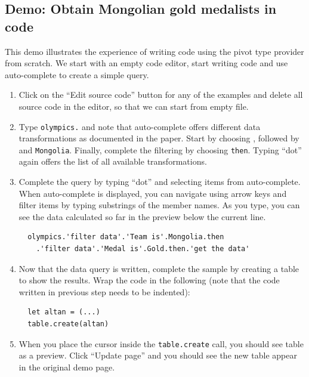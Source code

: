 \documentclass[a4paper,UKenglish]{lipics-v2016}
\theoremstyle{plain}
\theoremstyle{definition}
\begin{document}
\subsection{Demo: Obtain Mongolian gold medalists in code} 

This demo illustrates the experience of writing code using the pivot type provider from scratch.
We start with an empty code editor, start writing code and use auto-complete to create a simple
query.

\begin{enumerate}
\item Click on the ``Edit source code'' button for any of the examples and delete all source code
  in the editor, so that we can start from empty file.
  
\item Type \texttt{olympics.} and note that auto-complete offers different data transformations 
  as documented in the paper. Start by choosing , followed by 
   and \texttt{Mongolia}. Finally, complete the filtering by choosing \texttt{then}.
  Typing ``dot'' again offers the list of all available transformations.

\item Complete the query by typing ``dot'' and selecting items from auto-complete. When auto-complete
  is displayed, you can navigate using arrow keys and filter items by typing substrings of the
  member names. As you type, you can see the data calculated so far in the preview below the
  current line.

\begin{verbatim}
  olympics.'filter data'.'Team is'.Mongolia.then
    .'filter data'.'Medal is'.Gold.then.'get the data'
\end{verbatim}
  
\item Now that the data query is written, complete the sample by creating a table to show the results.
  Wrap the code in the following (note that the code written in previous step needs to be indented):

\begin{verbatim}
  let altan = (...)
  table.create(altan)   
\end{verbatim}

\item When you place the cursor inside the \texttt{table.create} call, you should see table as a
  preview. Click ``Update page'' and you should see the new table appear in the original demo page.
\end{enumerate}
\end{document}
